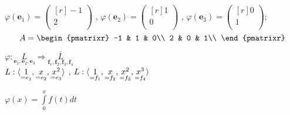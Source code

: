 $\varphi (\textbf{e$_1$})=\left(
\begin{smallmatrix*}[r]
-1\\ 2\\
\end{smallmatrix*}
\right) $
,
$\varphi (\textbf{e$_2$})=\left(
\begin{smallmatrix*}[r]
1\\ 0\\
\end{smallmatrix*}
\right) $
,
$\varphi (\textbf{e$_3$})=\left(
\begin{smallmatrix*}[r]
0\\ 1\\
\end{smallmatrix*}
\right) $;\\
$$A=
\begin{pmatrixr}
-1 & 1 & 0\\
2 & 0 & 1\\
\end{pmatrixr}
$$
\begin{prim}
	$ \varphi : \underset{\textbf{e$_1$}, \textbf{e$_2$}, \textbf{e$_3$}}L \Rightarrow \underset{\textbf{f$_1$}, \textbf{f$_2$}, \textbf{f$_3$}, \textbf{f$_4$}}{\bar L} $\\
	
	$L: \langle\underset{=\text{\textbf{$e_1$}}}1, \underset{=\text{\textbf{$e_2$}}}x, \underset{=\text{\textbf{$e_3$}}}{x^2}\rangle$ , 
	$L: \langle\underset{=\text{\textbf{$f_1$}}}1, \underset{=\text{\textbf{$f_2$}}}x, \underset{=\text{\textbf{$f_3$}}}{x^2}, \underset{=\text{\textbf{$f_4$}}}{x^3}\rangle$ \\
\end{prim}
$\varphi (x)=\int\limits^x_0 f(t)dt$\\
